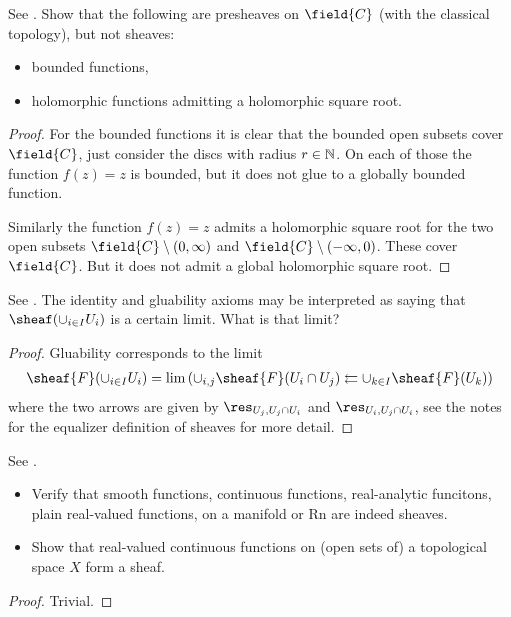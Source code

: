 \begin{exercise}[2.2.B]
  See \cite[2.2.B]{vakil2024the-rising-sea}.
  Show that the following are presheaves on $\field{C}$ (with the
  classical topology), but not sheaves:
  \begin{itemize}
  \item bounded functions,
  \item holomorphic functions admitting a holomorphic square root.
  \end{itemize}
\end{exercise}

\begin{proof}
  For the bounded functions it is clear that the bounded open subsets
  cover $\field{C}$, just consider the discs with radius $r\in
  \mathbb{N}$. On each of those the function $f(z)=z$ is bounded, but
  it does not glue to a globally bounded function.

  Similarly the function $f(z)=z$ admits a holomorphic square root for
  the two open subsets $\field{C}\setminus (0 , \infty)$ and
  $\field{C}\setminus (-\infty ,0)$. These cover $\field{C}$. But it
  does not admit a global holomorphic square root.
\end{proof}

\begin{exercise}[2.2.C]
  See \cite[2.2.C]{vakil2024the-rising-sea}.
  The identity and gluability axioms may be interpreted as saying that
  $\sheaf(\cup_{i\in I}U_i)$ is a certain limit. What is that limit?
\end{exercise}

\begin{proof}
  Gluability corresponds to the limit
  \begin{align*}
    \sheaf{F}(\cup_{i\in I}U_i) = \lim \left(
    \cup_{i,j}\sheaf{F}(U_i\cap U_j) \leftleftarrows \cup_{k\in I} \sheaf{F}(U_k) \right)
  \end{align*}
  where the two arrows are given by $\res_{U_j,U_j\cap U_i}$ and
  $\res_{U_i,U_j\cap U_i}$, see the notes for the equalizer definition
  of sheaves for more detail.
\end{proof}

\begin{exercise}[2.2.D]
  See \cite[2.2.D]{vakil2024the-rising-sea}.
  \begin{itemize}
  \item Verify that smooth functions, continuous functions, real-analytic
    funcitons, plain real-valued functions, on a manifold or Rn are
    indeed sheaves.
  \item Show that real-valued continuous functions on (open sets of) a topological space $X$ form a sheaf.
  \end{itemize}
\end{exercise}

\begin{proof}
  Trivial.
\end{proof}



